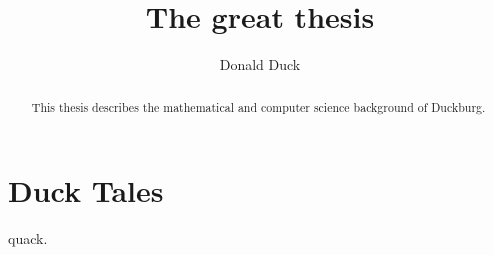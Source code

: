 \documentclass{kaumasters}
\title{The great thesis}
\author{Donald Duck}
\institute{Department of Mathematics and Computer Science}
\begin{document}
\frontmatter
\begin{abstract}
  This thesis describes the mathematical and computer science
  background of Duckburg.
\end{abstract}
\tableofcontents
\mainmatter
\section{Duck Tales}
quack.
\end{document}

